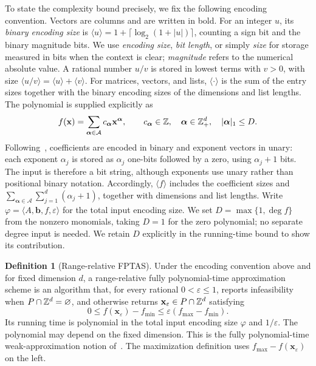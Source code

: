 \documentclass[final,5p,times,twocolumn]{elsarticle}
\theoremstyle{definition}\newtheorem{definition}{Definition}[section]
\theoremstyle{remark}\newtheorem{remark}[theorem]{Remark}
\newcommand{\eps}{\varepsilon}
\begin{document}
To state the complexity bound precisely, we fix the following encoding convention. Vectors are columns and are written in bold. For an integer $u$, its \emph{binary encoding size} is $\langle u\rangle=1+\lceil\log_2(1+|u|)\rceil$, counting a sign bit and the binary magnitude bits. We use \emph{encoding size}, \emph{bit length}, or simply \emph{size} for storage measured in bits when the context is clear; \emph{magnitude} refers to the numerical absolute value. A rational number $u/v$ is stored in lowest terms with $v>0$, with size $\langle u/v\rangle=\langle u\rangle+\langle v\rangle$. For matrices, vectors, and lists, $\langle\cdot\rangle$ is the sum of the entry sizes together with the binary encoding sizes of the dimensions and list lengths. The polynomial is supplied explicitly as
\[
 f(\mathbf{x})=\sum_{\boldsymbol{\alpha}\in\mathcal A}c_{\boldsymbol{\alpha}}\mathbf{x}^{\boldsymbol{\alpha}},
 \qquad c_{\boldsymbol{\alpha}}\in\mathbb Z,\quad \boldsymbol{\alpha}\in\mathbb Z_+^d,\quad |\boldsymbol{\alpha}|_1\le D.
\]
Following~\cite{DHKW08}, coefficients are encoded in binary and exponent vectors in unary: each exponent $\alpha_j$ is stored as $\alpha_j$ one-bits followed by a zero, using $\alpha_j+1$ bits. The input is therefore a bit string, although exponents use unary rather than positional binary notation. Accordingly, $\langle f\rangle$ includes the coefficient sizes and $\sum_{\boldsymbol{\alpha}\in\mathcal A}\sum_{j=1}^d(\alpha_j+1)$, together with dimensions and list lengths. Write $\varphi=\langle A,\mathbf b,f,\eps\rangle$ for the total input encoding size. We set $D=\max\{1,\deg f\}$ from the nonzero monomials, taking $D=1$ for the zero polynomial; no separate degree input is needed. We retain $D$ explicitly in the running-time bound to show its contribution.

\begin{definition}[Range-relative FPTAS]\label{def:fptas}
Under the encoding convention above and for fixed dimension $d$, a range-relative fully polynomial-time approximation scheme is an algorithm that, for every rational $0<\eps\le1$, reports infeasibility when $P\cap\mathbb Z^d=\varnothing$, and otherwise returns $\mathbf{x}_{\eps}\in P\cap\Z^d$ satisfying
\begin{equation}\label{eq:guarantee}
 0\le f(\mathbf{x}_{\eps})-f_{\min}\le\eps(f_{\max}-f_{\min}).
\end{equation}
Its running time is polynomial in the total input encoding size $\varphi$ and $1/\eps$. The polynomial may depend on the fixed dimension. This is the fully polynomial-time weak-approximation notion of~\cite{DHKW08}. The maximization definition uses $f_{\max}-f(\mathbf{x}_{\eps})$ on the left.
\end{definition}
\end{document}

